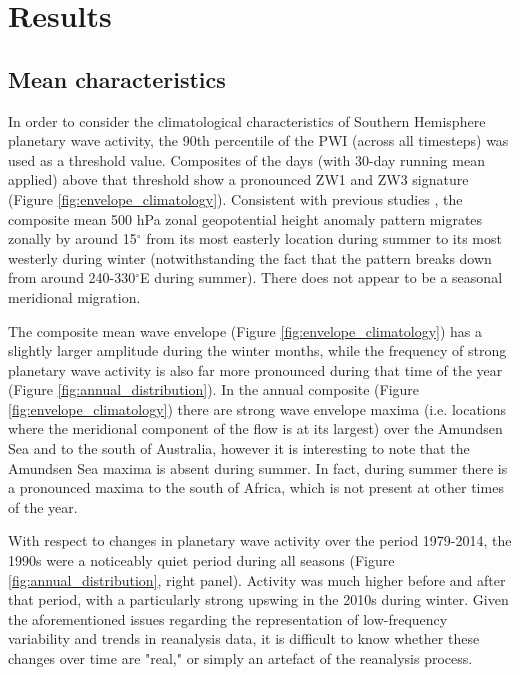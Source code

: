 \section{Results}

\subsection{Mean characteristics}

In order to consider the climatological characteristics of Southern Hemisphere planetary wave activity, the 90th percentile of the PWI (across all timesteps) was used as a threshold value. Composites of the days (with 30-day running mean applied) above that threshold show a pronounced ZW1 and ZW3 signature (Figure \ref{fig:envelope_climatology}). Consistent with previous studies \citep{vanLoon1984,Mo1985}, the composite mean 500 hPa zonal geopotential height anomaly pattern migrates zonally by around 15$^{\circ}$ from its most easterly location during summer to its most westerly during winter (notwithstanding the fact that the pattern breaks down from around 240-330$^{\circ}$E during summer). There does not appear to be a seasonal meridional migration.

The composite mean wave envelope (Figure \ref{fig:envelope_climatology}) has a slightly larger amplitude during the winter months, while the frequency of strong planetary wave activity is also far more pronounced during that time of the year (Figure \ref{fig:annual_distribution}). In the annual composite (Figure \ref{fig:envelope_climatology}) there are strong wave envelope maxima (i.e. locations where the meridional component of the flow is at its largest) over the Amundsen Sea and to the south of Australia, however it is interesting to note that the Amundsen Sea maxima is absent during summer. In fact, during summer there is a pronounced maxima to the south of Africa, which is not present at other times of the year.

With respect to changes in planetary wave activity over the period 1979-2014, the 1990s were a noticeably quiet period during all seasons (Figure \ref{fig:annual_distribution}, right panel). Activity was much higher before and after that period, with a particularly strong upswing in the 2010s during winter. Given the aforementioned issues regarding the representation of low-frequency variability and trends in reanalysis data, it is difficult to know whether these changes over time are "real," or simply an artefact of the reanalysis process.
